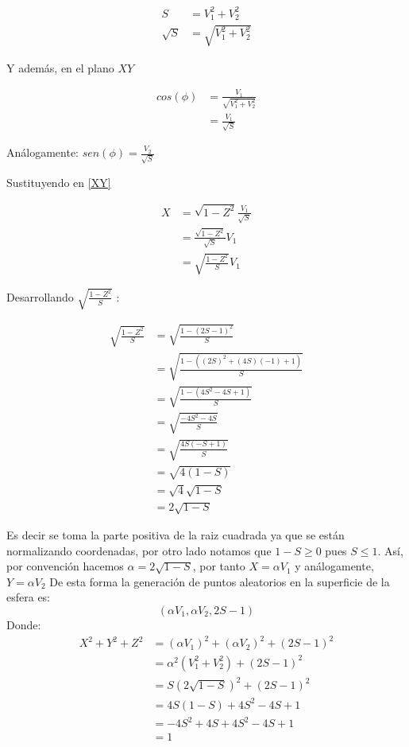 \begin{align*}
S &= V_1^2 + V_2^2\\
\sqrt{S}  &= \sqrt{V_1^2 + V_2^2}
\end{align*}

Y además, en el plano $XY$

\begin{align*}
    cos(\phi) &= \frac{V_1}{\sqrt{V_1^2 + V_2^2}}\\
    &= \frac{V_1}{\sqrt{S}}
\end{align*}

Análogamente: $sen(\phi) = \frac{V_2}{\sqrt{S}}$


Sustituyendo en \ref{XY}

\begin{align*}
    X &= \sqrt{1-Z^2} \frac{V_1}{\sqrt{S}}\\
      &= \frac{\sqrt{1- Z^2}}{\sqrt{S}} V_1\\
      &= \sqrt{\frac{1-Z^2}{S}} V_1
\end{align*}

Desarrollando $\sqrt{\frac{1-Z^2}{S}}$ :

\begin{align*}
    \sqrt{\frac{1-Z^2}{S}} &= \sqrt{\frac{1 - (2S-1)^2}{S}}\\
    &= \sqrt{\frac{1-((2S)^2 + (4S)(-1)+1)}{S}}\\
    &= \sqrt{\frac{1 - (4S^2 -4S +1)}{S}}\\
    &= \sqrt{\frac{-4S^2 - 4S}{S}}\\
    &= \sqrt{\frac{4S(-S+1)}{S}}\\
    &= \sqrt{4(1-S)}\\
    &= \sqrt{4}\sqrt{1-S}\\
    &=2\sqrt{1-S} 
\end{align*}

Es decir se toma la parte positiva de la raiz cuadrada ya que se están normalizando coordenadas, por otro lado notamos que $1-S \geq 0$ pues $S \leq 1$.
Así, por convención hacemos $\alpha = 2\sqrt{1-S}$, por tanto
$X = \alpha V_1$ y análogamente,
$Y = \alpha V_2$
De esta forma la generación de puntos aleatorios en la superficie de la esfera es:
\[
(\alpha V_1, \alpha V_2, 2S-1)
\]
Donde:
\begin{align*}
    X^2 + Y^2 + Z^2 &= (\alpha V_1)^2 + (\alpha V_2)^2 + (2S-1)^2\\
    &= \alpha^2(V_1^2 + V_2^2) + (2S-1)^2\\
    &= S(2\sqrt{1-S})^2 + (2S-1)^2\\
    &= 4S(1-S)+ 4S^2 -4S + 1\\
    &= -4S^2 + 4S + 4S^2 - 4S + 1\\
    &= 1
\end{align*}

